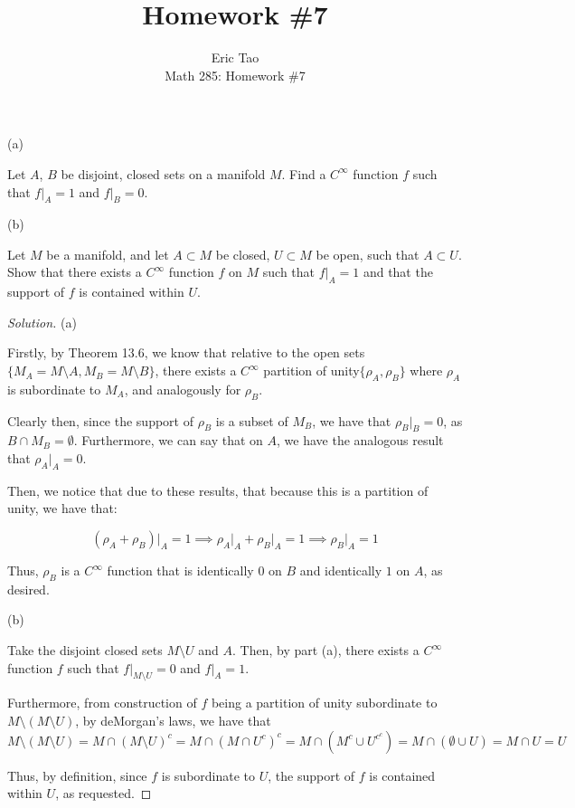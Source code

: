 \documentclass[10pt]{article}
\newenvironment{problem}[2][]{\begin{trivlist}
\item[\hskip \labelsep {\bfseries #1}\hskip \labelsep {\bfseries #2.}]}{\end{trivlist}}
\begin{document}
 
\title{Homework \#7}
\author{Eric Tao\\
Math 285: Homework \#7}
\maketitle

\begin{problem}{Question 1}

(a)

Let $A$, $B$ be disjoint, closed sets on a manifold $M$. Find a $C^\infty$ function $f$ such that $f |_A = 1$ and $f |_B = 0$.

(b)

Let $M$ be a manifold, and let $A \subset M$ be closed, $U \subset M$ be open, such that $A \subset U$. Show that there exists a $C^\infty$ function $f$ on $M$ such that $f|_A = 1 $ and that the support of $f$ is contained within $U$.


\end{problem}

\begin{proof}[Solution]
(a)

Firstly, by Theorem 13.6, we know that relative to the open sets $\{ M_A = M \setminus A, M_B = M \setminus B \}$, there exists a $C^\infty$ partition of unity$\{ \rho_A, \rho_B \}$ where $\rho_A$ is subordinate to $M_A$, and analogously for $\rho_B$.

Clearly then, since the support of $\rho_B$ is a subset of $M_B$, we have that $\rho_B \big|_B = 0$, as $B \cap M_B = \emptyset$. Furthermore, we can say that on $A$, we have the analogous result that $\rho_A \big|_A = 0$. 

Then, we notice that due to these results, that because this is a partition of unity, we have that:

$$ (\rho_A + \rho_B)\big|_{A} = 1 \implies  \rho_A \big|_A + \rho_B \big|_A = 1 \implies \rho_B \big|_A = 1$$

Thus, $\rho_B$ is a $C^\infty$ function that is identically 0 on $B$ and identically $1$ on $A$, as desired.

(b)

Take the disjoint closed sets $M \setminus U$ and $A$. Then, by part (a), there exists a $C^\infty$ function $f$ such that $f\big|_{M \setminus U} = 0$ and $f \big|_{A} = 1$.

Furthermore, from construction of $f$ being a partition of unity subordinate to $M \setminus (M \setminus U)$, by deMorgan's laws, we have that 
$$M \setminus (M \setminus U) = M \cap (M \setminus U)^c = M \cap (M \cap U^c)^c = M \cap (M^c \cup U^{c^c}) = M \cap (\emptyset \cup U) = M \cap U = U$$

Thus, by definition, since $f$ is subordinate to $U$, the support of $f$ is contained within $U$, as requested. 

\end{proof}
\end{document}
